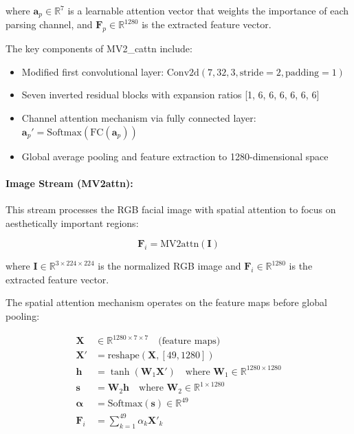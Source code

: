 where $\mathbf{a}_p \in \mathbb{R}^{7}$ is a learnable attention vector that weights the importance of each parsing channel, and $\mathbf{F}_p \in \mathbb{R}^{1280}$ is the extracted feature vector.

The key components of MV2\_cattn include:
\begin{itemize}
    \item Modified first convolutional layer: $\text{Conv2d}(7, 32, 3, \text{stride}=2, \text{padding}=1)$
    \item Seven inverted residual blocks with expansion ratios [1, 6, 6, 6, 6, 6, 6]
    \item Channel attention mechanism via fully connected layer: $\mathbf{a}_p' = \text{Softmax}(\text{FC}(\mathbf{a}_p))$
    \item Global average pooling and feature extraction to 1280-dimensional space
\end{itemize}

\paragraph{Image Stream (MV2attn):}
This stream processes the RGB facial image with spatial attention to focus on aesthetically important regions:

\begin{equation}
\mathbf{F}_i = \text{MV2attn}(\mathbf{I})
\end{equation}

where $\mathbf{I} \in \mathbb{R}^{3 \times 224 \times 224}$ is the normalized RGB image and $\mathbf{F}_i \in \mathbb{R}^{1280}$ is the extracted feature vector.

The spatial attention mechanism operates on the feature maps before global pooling:

\begin{align}
\mathbf{X} &\in \mathbb{R}^{1280 \times 7 \times 7} \quad \text{(feature maps)} \\
\mathbf{X}' &= \text{reshape}(\mathbf{X}, [49, 1280]) \\
\mathbf{h} &= \tanh(\mathbf{W}_1 \mathbf{X}') \quad \text{where } \mathbf{W}_1 \in \mathbb{R}^{1280 \times 1280} \\
\mathbf{s} &= \mathbf{W}_2 \mathbf{h} \quad \text{where } \mathbf{W}_2 \in \mathbb{R}^{1 \times 1280} \\
\boldsymbol{\alpha} &= \text{Softmax}(\mathbf{s}) \in \mathbb{R}^{49} \\
\mathbf{F}_i &= \sum_{k=1}^{49} \alpha_k \mathbf{X}'_k
\end{align}

